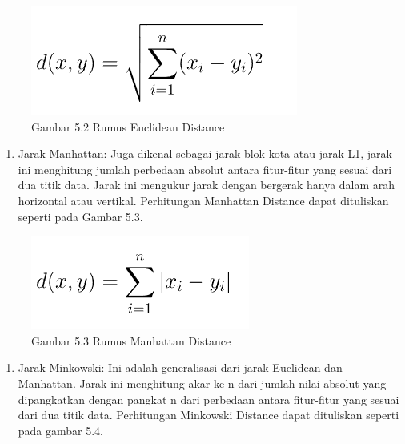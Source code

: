 \documentclass[
  letterpaper,
  DIV=11,
  numbers=noendperiod]{scrreprt}
\providecommand{\tightlist}{%
  \setlength{\itemsep}{0pt}\setlength{\parskip}{0pt}}\usepackage{longtable,booktabs,array}
\begin{document}
\begin{figure}

{\centering \includegraphics{Asset/euclideanrumus.png}

}

\caption{Gambar 5.2 Rumus Euclidean Distance}

\end{figure}

\begin{enumerate}
\def\labelenumi{\alph{enumi})}
\setcounter{enumi}{1}
\tightlist
\item
  Jarak Manhattan: Juga dikenal sebagai jarak blok kota atau jarak L1,
  jarak ini menghitung jumlah perbedaan absolut antara fitur-fitur yang
  sesuai dari dua titik data. Jarak ini mengukur jarak dengan bergerak
  hanya dalam arah horizontal atau vertikal. Perhitungan Manhattan
  Distance dapat dituliskan seperti pada Gambar 5.3.
\end{enumerate}

\begin{figure}

{\centering \includegraphics{Asset/manhattandistance.png}

}

\caption{Gambar 5.3 Rumus Manhattan Distance}

\end{figure}

\begin{enumerate}
\def\labelenumi{\alph{enumi})}
\setcounter{enumi}{2}
\tightlist
\item
  Jarak Minkowski: Ini adalah generalisasi dari jarak Euclidean dan
  Manhattan. Jarak ini menghitung akar ke-n dari jumlah nilai absolut
  yang dipangkatkan dengan pangkat n dari perbedaan antara fitur-fitur
  yang sesuai dari dua titik data. Perhitungan Minkowski Distance dapat
  dituliskan seperti pada gambar 5.4.
\end{enumerate}
\end{document}

